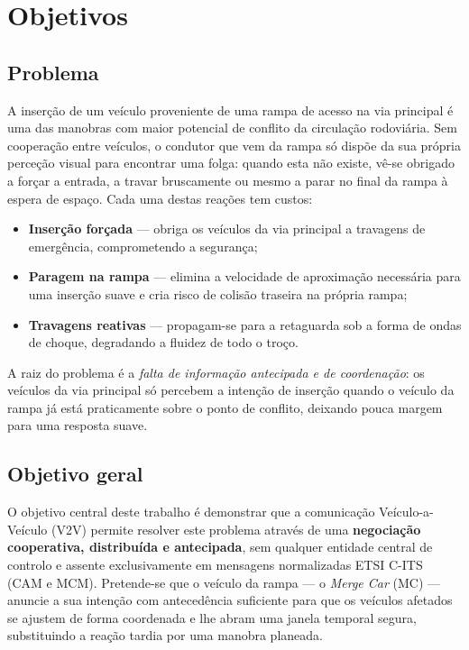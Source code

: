 \documentclass[11pt,a4paper]{article}
\begin{document}
\section{Objetivos}
\label{sec:objetivos}

\subsection{Problema}

A inserção de um veículo proveniente de uma rampa de acesso na via principal é uma das
manobras com maior potencial de conflito da circulação rodoviária. Sem cooperação entre
veículos, o condutor que vem da rampa só dispõe da sua própria perceção visual para
encontrar uma folga: quando esta não existe, vê-se obrigado a forçar a entrada, a travar
bruscamente ou mesmo a parar no final da rampa à espera de espaço. Cada uma destas
reações tem custos:

\begin{itemize}[noitemsep,topsep=2pt]
  \item \textbf{Inserção forçada} --- obriga os veículos da via principal a travagens de
        emergência, comprometendo a segurança;
  \item \textbf{Paragem na rampa} --- elimina a velocidade de aproximação necessária para
        uma inserção suave e cria risco de colisão traseira na própria rampa;
  \item \textbf{Travagens reativas} --- propagam-se para a retaguarda sob a forma de ondas de
        choque, degradando a fluidez de todo o troço.
\end{itemize}

A raiz do problema é a \emph{falta de informação antecipada e de coordenação}: os
veículos da via principal só percebem a intenção de inserção quando o veículo da rampa já
está praticamente sobre o ponto de conflito, deixando pouca margem para uma resposta
suave.

\subsection{Objetivo geral}

O objetivo central deste trabalho é demonstrar que a comunicação Veículo-a-Veículo (V2V)
permite resolver este problema através de uma \textbf{negociação cooperativa, distribuída
e antecipada}, sem qualquer entidade central de controlo e assente exclusivamente em
mensagens normalizadas ETSI C-ITS (CAM e MCM). Pretende-se que o veículo da rampa --- o
\emph{Merge Car} (MC) --- anuncie a sua intenção com antecedência suficiente para que os
veículos afetados se ajustem de forma coordenada e lhe abram uma janela temporal segura,
substituindo a reação tardia por uma manobra planeada.
\end{document}
